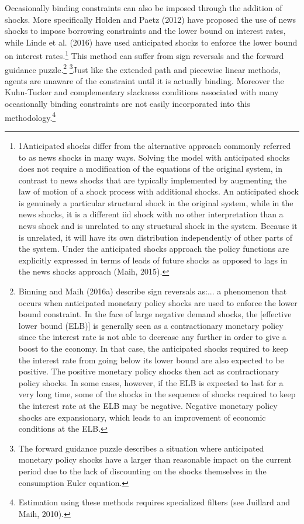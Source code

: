 \documentclass[10pt,math=newtx,citestyle=gb7714-2015,bibstyle=gb7714-2015]{elegantbook}
\begin{document}
Occasionally binding constraints can also be imposed through the addition of shocks. More specifically Holden and Paetz (2012) have proposed the use of news shocks to impose borrowing constraints and the lower bound on interest rates, while Linde et al. (2016) have used anticipated shocks to enforce the lower bound on interest rates.\footnote{1Anticipated shocks differ from the alternative approach commonly referred to as news shocks in many ways. Solving the model with anticipated shocks does not require a modification of the equations of the original system, in contrast to news shocks that are typically implemented by augmenting the law of motion of a shock process with additional shocks. An anticipated shock is genuinely a particular structural shock in the original system, while in the news shocks, it is a different iid shock with no other interpretation than a news shock and is unrelated to any structural shock in the system. Because it is unrelated, it will have its own distribution independently of other parts of the system. Under the anticipated shocks approach the policy functions are explicitly expressed in terms of leads of future shocks as opposed to lags in the news shocks approach (Maih, 2015).} This method can suffer from sign reversals and the forward guidance puzzle.\footnote{Binning and Maih (2016a) describe sign reversals as:... a phenomenon that occurs when anticipated monetary policy shocks are used to enforce the lower bound constraint. In the face of large negative demand shocks, the [effective lower bound (ELB)] is generally seen as a contractionary monetary policy since the interest rate is not able to decrease any further in order to give a boost to the economy. In that case, the anticipated shocks required to keep the interest rate from going below its lower bound are also expected to be positive. The positive monetary policy shocks then act as contractionary policy shocks. In some cases, however, if the ELB is expected to last for a very long time, some of the shocks in the sequence of shocks required to keep the interest rate at the ELB may be negative. Negative monetary policy shocks are expansionary, which leads to an improvement of economic conditions at the ELB.} \footnote{The forward guidance puzzle describes a situation where anticipated monetary policy shocks have a larger than reasonable impact on the current period due to the lack of discounting on the shocks themselves in the consumption Euler equation.}Just like the extended path and piecewise linear methods, agents are unaware of the constraint until it is actually binding. Moreover the Kuhn-Tucker and complementary slackness conditions associated with many occasionally binding constraints are not easily incorporated into this methodology.\footnote{Estimation using these methods requires specialized filters (see Juillard and Maih, 2010).}
\end{document}
